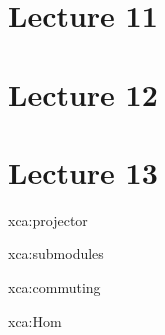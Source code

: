 \section*{Lecture 11}
\section*{Lecture 12}
\section*{Lecture 13}

\begin{sol}{xca:projector}
\end{sol}

\begin{sol}{xca:submodules}
\end{sol}

\begin{sol}{xca:commuting}
\end{sol}

\begin{sol}{xca:Hom}
\end{sol}
